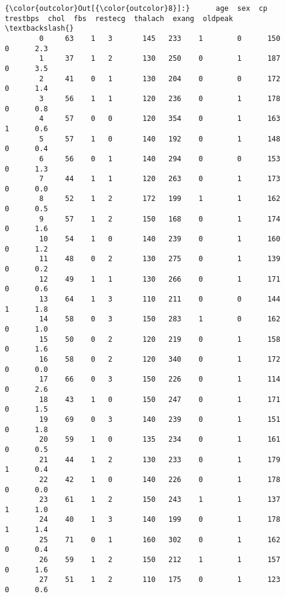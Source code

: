 \documentclass[11pt]{article}
\begin{document}
\begin{Verbatim}[commandchars=\\\{\}]
{\color{outcolor}Out[{\color{outcolor}8}]:}      age  sex  cp  trestbps  chol  fbs  restecg  thalach  exang  oldpeak  \textbackslash{}
        0     63    1   3       145   233    1        0      150      0      2.3   
        1     37    1   2       130   250    0        1      187      0      3.5   
        2     41    0   1       130   204    0        0      172      0      1.4   
        3     56    1   1       120   236    0        1      178      0      0.8   
        4     57    0   0       120   354    0        1      163      1      0.6   
        5     57    1   0       140   192    0        1      148      0      0.4   
        6     56    0   1       140   294    0        0      153      0      1.3   
        7     44    1   1       120   263    0        1      173      0      0.0   
        8     52    1   2       172   199    1        1      162      0      0.5   
        9     57    1   2       150   168    0        1      174      0      1.6   
        10    54    1   0       140   239    0        1      160      0      1.2   
        11    48    0   2       130   275    0        1      139      0      0.2   
        12    49    1   1       130   266    0        1      171      0      0.6   
        13    64    1   3       110   211    0        0      144      1      1.8   
        14    58    0   3       150   283    1        0      162      0      1.0   
        15    50    0   2       120   219    0        1      158      0      1.6   
        16    58    0   2       120   340    0        1      172      0      0.0   
        17    66    0   3       150   226    0        1      114      0      2.6   
        18    43    1   0       150   247    0        1      171      0      1.5   
        19    69    0   3       140   239    0        1      151      0      1.8   
        20    59    1   0       135   234    0        1      161      0      0.5   
        21    44    1   2       130   233    0        1      179      1      0.4   
        22    42    1   0       140   226    0        1      178      0      0.0   
        23    61    1   2       150   243    1        1      137      1      1.0   
        24    40    1   3       140   199    0        1      178      1      1.4   
        25    71    0   1       160   302    0        1      162      0      0.4   
        26    59    1   2       150   212    1        1      157      0      1.6   
        27    51    1   2       110   175    0        1      123      0      0.6   

\end{Verbatim}
\end{document}
